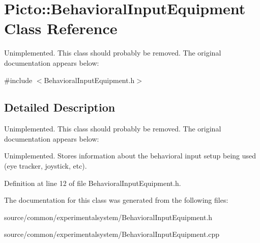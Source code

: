 \hypertarget{class_picto_1_1_behavioral_input_equipment}{\section{Picto\-:\-:Behavioral\-Input\-Equipment Class Reference}
\label{class_picto_1_1_behavioral_input_equipment}
}


Unimplemented. This class should probably be removed. The original documentation appears below\-:  




{\ttfamily \#include $<$Behavioral\-Input\-Equipment.\-h$>$}



\subsection{Detailed Description}
Unimplemented. This class should probably be removed. The original documentation appears below\-: 

Unimplemented. Stores information about the behavioral input setup being used (eye tracker, joystick, etc). 

Definition at line 12 of file Behavioral\-Input\-Equipment.\-h.



The documentation for this class was generated from the following files\-:\begin{DoxyCompactItemize}
\item 
source/common/experimentalsystem/Behavioral\-Input\-Equipment.\-h\item 
source/common/experimentalsystem/Behavioral\-Input\-Equipment.\-cpp\end{DoxyCompactItemize}
